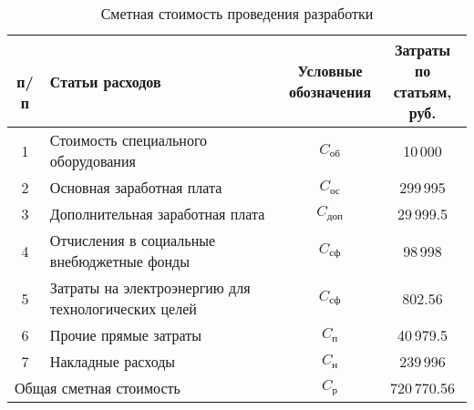 \begin{table}[h!]
	\caption{Сметная стоимость проведения разработки}
	\begin{tabular}{|c|p{9cm}|c|c|}
		\hline
			\thead{\No \\ п/п} & Статьи расходов & \thead{Условные\\обозначения} & \thead{Затраты по\\ статьям, руб.}\\
		\hline
			1 & Стоимость специального оборудования & $C_\textit{об}$ & 10\,000 \\
		\hline
			2 & Основная заработная плата & $C_\textit{ос}$ & 299\,995 \\
		\hline
			3 & Дополнительная заработная плата & $C_\textit{доп}$ & 29\,999.5 \\
		\hline
			4 & Отчисления в социальные внебюджетные фонды & $C_\textit{сф}$ & 98\,998 \\
		\hline
			5 & Затраты на электроэнергию для технологических целей  & $C_\textit{сф}$ & 802.56 \\
		\hline
			6 & Прочие прямые затраты & $C_\textit{п}$ & 40\,979.5 \\
		\hline		
			7 & Накладные расходы & $C_\textit{н}$ & 239\,996 \\
		\hline		
			\multicolumn{2}{|l|}{Общая сметная стоимость} & $C_\textit{р}$ & 720\,770.56 \\
		\hline
	\end{tabular}
\end{table}